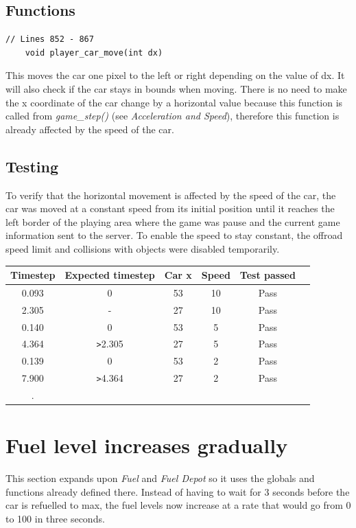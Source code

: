 \documentclass{article}
\begin{document}
\subsection*{Functions}
\begin{lstlisting}[style=CStyle]
	// Lines 852 - 867
	void player_car_move(int dx)
\end{lstlisting}
This moves the car one pixel to the left or right depending on the value of dx. It will also check if the car stays in bounds when moving. There is no need to make the x coordinate of the car change by a horizontal value because this function is called from \emph{game\_step()} (see \emph{Acceleration and Speed}), therefore this function is already affected by the speed of the car.
\newline

\subsection*{Testing}
To verify that the horizontal movement is affected by the speed of the car, the car was moved at a constant speed from its initial position until it reaches the left border of the playing area where the game was pause and the current game information sent to the server. To enable the speed to stay constant, the offroad speed limit and collisions with objects were disabled temporarily.
\begin{center}
\begin{tabular}{ c c c c c c }
Timestep	& Expected timestep	& Car x 	& Speed	& Test passed	\\ \hline
0.093		& 0				& 53		& 10		& Pass		\\
2.305		& - 				& 27		& 10		& Pass		\\
0.140		& 0				& 53		& 5		& Pass		\\
4.364		& \verb|>|2.305		& 27		& 5		& Pass		\\
0.139		& 0				& 53		& 2		& Pass		\\
7.900		& \verb|>|4.364		& 27		& 2		& Pass		\\ \hline.
\end{tabular}
\end{center}

\clearpage

\section{Fuel level increases gradually}
This section expands upon \emph{Fuel} and \emph{Fuel Depot}  so it uses the globals and functions already defined there. Instead of having to wait for 3 seconds before the car is refuelled to max, the fuel levels now increase at a rate that would go from 0 to 100 in three seconds.  
\end{document}
